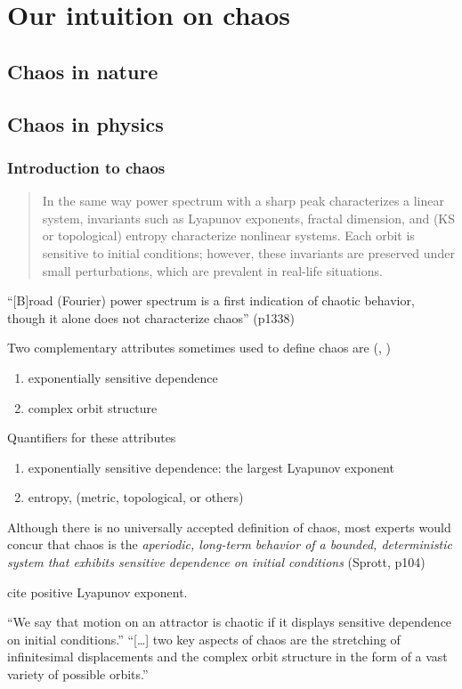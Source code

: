 \documentclass[11pt]{book}
\begin{document}
\chapter{Our intuition on chaos}
\section{Chaos in nature}

\section{Chaos in physics}
\subsection{Introduction to chaos}
\begin{quote}
In the same way power spectrum with a sharp peak characterizes a linear system, invariants such as Lyapunov exponents, fractal dimension, and (KS or topological) entropy characterize nonlinear systems.
Each orbit is sensitive to initial conditions; however, these invariants are preserved under small perturbations, which are prevalent in real-life situations.
\end{quote}
``[B]road (Fourier) power spectrum is a first indication of chaotic behavior, though it alone does not characterize chaos'' (p1338)
\citep{abarbanel}

Two complementary attributes sometimes used to define chaos are (\cite[p.~379]{Ott}, )
\begin{enumerate}
  \item exponentially sensitive dependence
  \item complex orbit structure
\end{enumerate}
Quantifiers for these attributes
\begin{enumerate}
  \item exponentially sensitive dependence: the largest Lyapunov exponent  
  \item entropy, (metric, topological, or others)
\end{enumerate}

Although there is no universally accepted definition of chaos, most experts would concur that chaos is the {\it aperiodic, long-term behavior of a bounded, deterministic system that exhibits sensitive dependence on initial conditions} (Sprott, p104)

\citet{kantz-schreiber} cite positive Lyapunov exponent.

``We say that motion on an attractor is chaotic if it displays sensitive dependence on initial conditions.'' \citep[p~11]{ott1994}
``[\ldots] two key aspects of chaos are the stretching of infinitesimal displacements and the complex orbit structure in the form of a vast variety of possible orbits.'' \citep[p~31]{ott2002}
\end{document}
